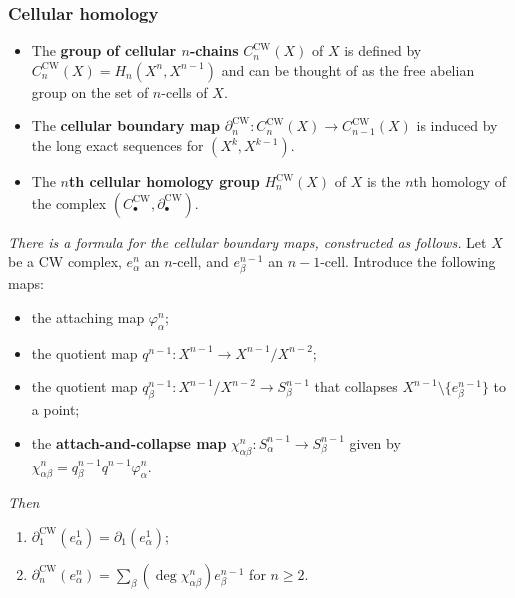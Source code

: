\documentclass[10pt]{article}
\begin{document}
            \subsubsection{Cellular homology}

                \begin{itemize}
                    \item The \textbf{group of cellular $n$-chains} $C_n^\text{CW}(X)$ of $X$ is defined by $C_n^\text{CW}(X)=H_n(X^n,X^{n-1})$ and can be thought of as the free abelian group on the set of $n$-cells of $X$.
                    \item The \textbf{cellular boundary map} $\partial_n^\text{CW}\colon C_n^\text{CW}(X)\to C_{n-1}^\text{CW}(X)$ is induced by the long exact sequences for $(X^k,X^{k-1})$.
                    \item The \textbf{$n$th cellular homology group} $H_n^\text{CW}(X)$ of $X$ is the $n$th homology of the complex $(C_\bullet^\text{CW},\partial_\bullet^\text{CW})$.
                \end{itemize}

                \emph{There is a formula for the cellular boundary maps, constructed as follows.}
                Let $X$ be a CW complex, $e_\alpha^n$ an $n$-cell, and $e_\beta^{n-1}$ an $n-1$-cell.
                Introduce the following maps:
                \begin{itemize}
                    \item the attaching map $\varphi_\alpha^n$;
                    \item the quotient map $q^{n-1}\colon X^{n-1}\to X^{n-1}/X^{n-2}$;
                    \item the quotient map $q_\beta^{n-1}\colon X^{n-1}/X^{n-2}\to S_\beta^{n-1}$ that collapses $X^{n-1}\setminus \{e_\beta^{n-1}\}$ to a point;
                    \item the \textbf{attach-and-collapse map} $\chi^n_{\alpha\beta}\colon S_\alpha^{n-1}\to S_\beta^{n-1}$ given by $\chi^n_{\alpha\beta}=q_\beta^{n-1} q^{n-1}\varphi_\alpha^n$.
                \end{itemize}
                \emph{Then}
                \begin{enumerate}
                    \item $\partial_1^\text{CW}(e_\alpha^1)=\partial_1(e_\alpha^1)$;
                    \item $\partial_n^\text{CW}(e^n_\alpha)=\sum_\beta \left(\deg\chi^n_{\alpha\beta}\right) e^{n-1}_\beta$ for $n\geqslant2$.
                \end{enumerate}
\end{document}
